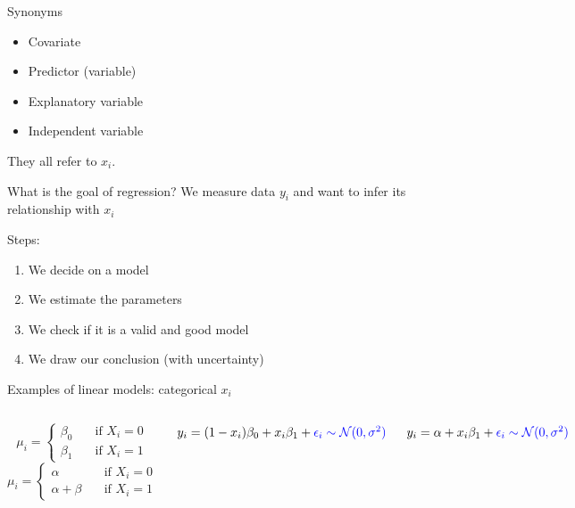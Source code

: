 \documentclass[
  ignorenonframetext,
]{beamer}
\providecommand{\tightlist}{%
  \setlength{\itemsep}{0pt}\setlength{\parskip}{0pt}}
\newcommand{\columnsbegin}{\begin{columns}}
\newcommand{\columnsend}{\end{columns}}
\begin{document}
\begin{frame}{Synonyms}
\label{synonyms}
\begin{itemize}
\tightlist
\item
  Covariate
\item
  Predictor (variable)
\item
  Explanatory variable
\item
  Independent variable
\end{itemize}

They all refer to \(x_i\).
\end{frame}

\begin{frame}{What is the goal of regression?}
\label{what-is-the-goal-of-regression}
We measure data \(y_i\) and want to infer its relationship with \(x_i\)

Steps:

\begin{enumerate}
[1)]
\tightlist
\item
  We decide on a model
\item
  We estimate the parameters
\item
  We check if it is a valid and good model
\item
  We draw our conclusion (with uncertainty)
\end{enumerate}
\end{frame}

\begin{frame}{Examples of linear models: categorical \(x_i\)}
\label{examples-of-linear-models-categorical-x_i}
\columnsbegin
{}

\[
\mu_i =
  \begin{cases}
    \beta_0       & \quad \text{if } X_i =0 \\
    \beta_1      & \quad \text{if } X_i =1  
  \end{cases}
\] \[
\mu_i =
  \begin{cases}
    \alpha       & \quad \text{if } X_i =0 \\
    \alpha + \beta       & \quad \text{if } X_i =1  
  \end{cases}
\] 

\(y_i = (1-x_i)\beta_0 + x_i\beta_1 + \textcolor{blue}{\epsilon_i\sim \mathcal{N}(0,\sigma^2)}\)

\vspace{2\baselineskip}

\(y_i = \alpha+ x_i\beta_1 + \textcolor{blue}{\epsilon_i\sim \mathcal{N}(0,\sigma^2)}\)

\columnsend
\end{frame}
\end{document}

